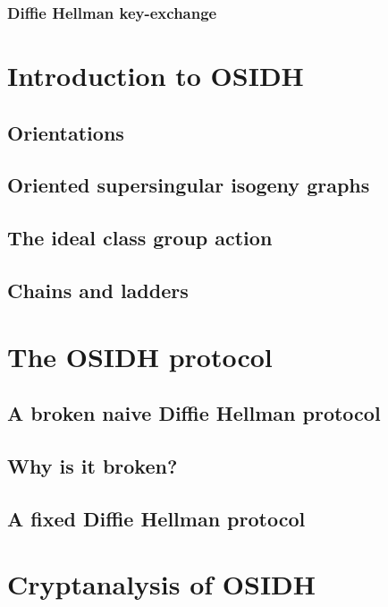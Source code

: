 \documentclass[10pt]{beamer}
\theoremstyle{plain}
\theoremstyle{definition}
\renewcommand{\(}{\left(}
\renewcommand{\)}{\right)}
\begin{document}
\subsubsection{Diffie Hellman key-exchange}


\section{Introduction to OSIDH}

\subsection{Orientations}

\subsection{Oriented supersingular isogeny graphs}

\subsection{The ideal class group action}

\subsection{Chains and ladders}

\section{The OSIDH protocol}

\subsection{A broken naive Diffie Hellman protocol}

\subsection{Why is it broken?}

\subsection{A fixed Diffie Hellman protocol}

\section{Cryptanalysis of OSIDH}
\end{document}
